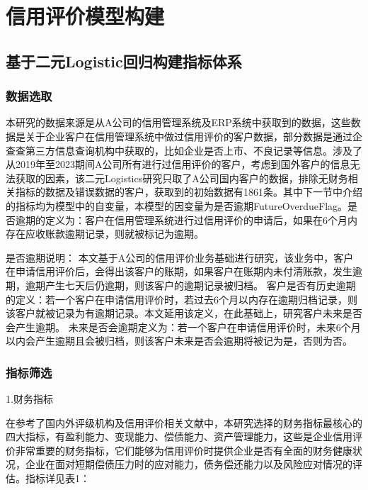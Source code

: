 \chapter{信用评价模型构建}

\section{基于二元Logistic回归构建指标体系}

\subsection{数据选取}
本研究的数据来源是从A公司的信用管理系统及ERP系统中获取到的数据，这些数据是关于企业客户在信用管理系统中做过信用评价的客户数据，部分数据是通过企查查第三方信息查询机构中获取的，比如企业是否上市、不良记录等信息。涉及了从2019年至2023期间A公司所有进行过信用评价的客户，考虑到国外客户的信息无法获取的因素，该二元Logistics研究只取了A公司国内客户的数据，排除无财务相关指标的数据及错误数据的客户，获取到的初始数据有1861条。其中下一节中介绍的指标均为模型中的自变量，本模型的因变量为是否逾期FutureOverdueFlag。是否逾期的定义为：客户在信用管理系统进行过信用评价的申请后，如果在6个月内存在应收账款逾期记录，则就被标记为逾期。

是否逾期说明：
本文基于A公司的信用评价业务基础进行研究，该业务中，客户在申请信用评价后，会得出该客户的账期，如果客户在账期内未付清账款，发生逾期，逾期产生七天后仍逾期，则该客户的逾期记录被归档。
客户是否有历史逾期的定义：若一个客户在申请信用评价时，若过去6个月以内存在逾期归档记录，则该客户就被记录为有逾期记录。本文延用该定义，在此基础上，研究客户未来是否会产生逾期。
未来是否会逾期定义为：若一个客户在申请信用评价时，未来6个月以内会产生逾期且会被归档，则该客户未来是否会逾期将被记为是，否则为否。

\subsection{指标筛选}
1.财务指标

在参考了国内外评级机构及信用评价相关文献中，本研究选择的财务指标最核心的四大指标，有盈利能力、变现能力、偿债能力、资产管理能力，这些是企业信用评价非常重要的财务指标，它们能够为信用评价时提供企业是否有全面的财务健康状况，企业在面对短期偿债压力时的应对能力，债务偿还能力以及风险应对情况的评估。指标详见表1：


